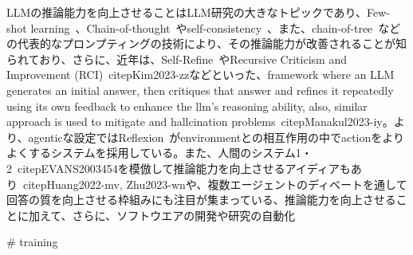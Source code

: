LLMの推論能力を向上させることはLLM研究の大きなトピックであり、Few-shot learning~\citep{Brown2020-bw}、Chain-of-thought~\citep{Wei2022-kt}やself-consistency~\citep{Wang2023-pf}、また、chain-of-tree~\citep{Yao2023-ey}などの代表的なプロンプティングの技術により、その推論能力が改善されることが知られており、さらに、近年は、Self-Refine~\citep{Madaan2023-fn}やRecursive Criticism and Improvement (RCI)~citep{Kim2023-zz}などといった、framework where an LLM generates an initial answer, then critiques that answer and refines it repeatedly using its own feedback to enhance the llm's reasoning ability, also, similar approach is used to mitigate and hallcination problems~citep{Manakul2023-iy}。より、agenticな設定ではReflexion~\citep{Shinn2023-no}がenvironmentとの相互作用の中でactionをよりよくするシステムを採用している。また、人間のシステム1・2~citep{EVANS2003454}を模倣して推論能力を向上させるアイディアもあり~citep{Huang2022-mv, Zhu2023-wn}や、複数エージェントのディベートを通して回答の質を向上させる枠組みにも注目が集まっている\citep{Chen2024-ua, Du2024-pi, Smit2024-cn}、推論能力を向上させることに加えて、さらに、ソフトウエアの開発\citep{Qian2024-gr}や研究の自動化\citep{Lu2024-za,Liu2024-yg}

# training
